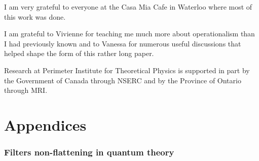 \documentclass[10pt]{article}
\begin{document}
I am very grateful to everyone at the Casa Mia Cafe in Waterloo where most of this work was done.

I am grateful to Vivienne for teaching me much more about operationalism than I had previously known and to Vanessa for numerous useful discussions that helped shape the form of this rather long paper.

Research at Perimeter Institute for Theoretical Physics is supported in part by the Government of Canada through NSERC and by the Province of Ontario
through MRI.


\newpage


\part*{Appendices}


\appendix







\section{Filters non-flattening in quantum theory}\label{appendixflattening}
\end{document}
